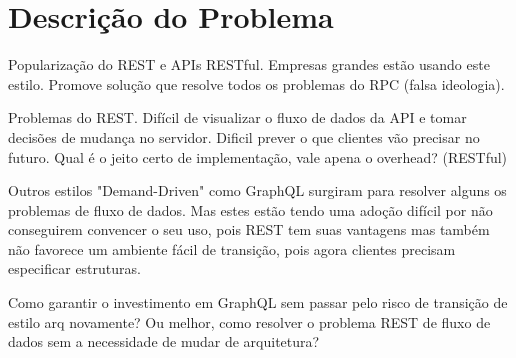 \section[Descrição do Problema]{Descrição do Problema}

Popularização do REST e APIs RESTful. Empresas grandes estão usando este estilo. Promove solução que resolve todos os problemas do RPC (falsa ideologia).

Problemas do REST. Difícil de visualizar o fluxo de dados da API e tomar decisões de mudança no servidor. Dificil prever o que clientes vão precisar no futuro. Qual é o jeito certo de implementação, vale apena o overhead? (RESTful)

Outros estilos "Demand-Driven" como GraphQL surgiram para resolver alguns os problemas de fluxo de dados. Mas estes estão tendo uma adoção difícil por não conseguirem convencer o seu uso, pois REST tem suas vantagens mas também não favorece um ambiente fácil de transição, pois agora clientes precisam especificar estruturas. 

Como garantir o investimento em GraphQL sem passar pelo risco de transição de estilo arq novamente? Ou melhor, como resolver o problema REST de fluxo de dados sem a necessidade de mudar de arquitetura?

